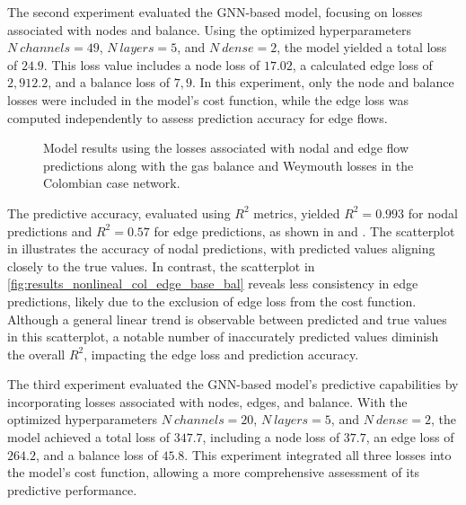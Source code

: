 The second experiment evaluated the GNN-based model, focusing on losses associated with nodes and balance. Using the optimized hyperparameters \( N \ channels = 49 \), \( N \ layers = 5 \), and \( N \ dense = 2 \), the model yielded a total loss of \( 24.9 \). This loss value includes a node loss of \( 17.02 \), a calculated edge loss of \( 2,912.2 \), and a balance loss of \( 7,9 \). In this experiment, only the node and balance losses were included in the model's cost function, while the edge loss was computed independently to assess prediction accuracy for edge flows.


\begin{figure}[htbp]
    \centering
    \setlength{}        
    \setlength{} 
    
    \caption{Model results using the losses associated with nodal and edge flow predictions along with the gas balance and Weymouth losses in the Colombian case network.}
    \label{fig:col_base_bal_results_non_lineal}
\end{figure}



The predictive accuracy, evaluated using \( R^2 \) metrics, yielded \( R^2 = 0.993 \) for nodal predictions and \( R^2 = 0.57 \) for edge predictions, as shown in  and . The scatterplot in  illustrates the accuracy of nodal predictions, with predicted values aligning closely to the true values. In contrast, the scatterplot in \cref{fig:results_nonlineal_col_edge_base_bal} reveals less consistency in edge predictions, likely due to the exclusion of edge loss from the cost function. Although a general linear trend is observable between predicted and true values in this scatterplot, a notable number of inaccurately predicted values diminish the overall \( R^2 \), impacting the edge loss and prediction accuracy.







The third experiment evaluated the GNN-based model's predictive capabilities by incorporating losses associated with nodes, edges, and balance. With the optimized hyperparameters \( N \ channels = 20 \), \( N \ layers = 5 \), and \( N \ dense = 2 \), the model achieved a total loss of \( 347.7 \), including a node loss of \( 37.7 \), an edge loss of \( 264.2 \), and a balance loss of \( 45.8 \). This experiment integrated all three losses into the model's cost function, allowing a more comprehensive assessment of its predictive performance.

